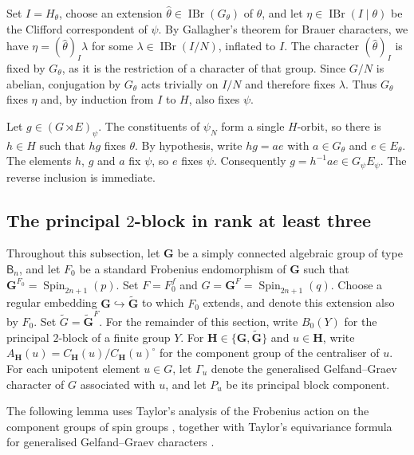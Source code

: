 \documentclass[10pt]{amsart}
\theoremstyle{definition}
\let\oldendproof\endproof
\renewenvironment{proof}[1][\proofname]{%
  \oldproof[\bfseries #1]%
}{\oldendproof}
\DeclareMathOperator{\IBr}{IBr}
\numberwithin{equation}{section}
\numberwithin{table}{section}
\begin{document}
\begin{proof}
Set $I=H_\theta$, choose an extension
$\widehat\theta\in\IBr(G_\theta)$ of $\theta$, and let
$\eta\in\IBr(I\mid\theta)$ be the Clifford correspondent of $\psi$.
By Gallagher's theorem for Brauer characters, we have
$\eta=(\widehat\theta)_I\lambda$ for some
$\lambda\in\IBr(I/N)$, inflated to $I$.
The character $(\widehat\theta)_I$ is fixed by
$G_\theta$, as it is the restriction of a character of that
group.  Since $G/N$ is abelian, conjugation by
$G_\theta$ acts trivially on $I/N$ and therefore fixes
$\lambda$.  Thus $G_\theta$ fixes $\eta$ and, by induction
from $I$ to $H$, also fixes $\psi$.

Let $g\in(G\rtimes E)_\psi$.  The constituents of
$\psi_N$ form a single $H$-orbit, so there is $h\in H$ such that
$hg$ fixes $\theta$.  By hypothesis, write $hg=ae$ with
$a\in G_\theta$ and $e\in E_\theta$.
The elements $h$, $g$ and $a$ fix $\psi$, so $e$ fixes $\psi$.
Consequently $g=h^{-1}ae\in G_\psi E_\psi$.
The reverse inclusion is immediate.
\end{proof}

\subsection{The principal \texorpdfstring{$2$}{2}-block in rank at least three}
\label{subsec:type-b-two-principal}

Throughout this subsection, let $\mathbf G$ be a simply connected algebraic
group of type $\mathsf B_n$,
and let $F_0$ be a standard Frobenius endomorphism of $\mathbf G$
such that $\mathbf G^{F_0}=\operatorname{Spin}_{2n+1}(p)$.
Set $F=F_0^f$ and
$G=\mathbf G^F=\operatorname{Spin}_{2n+1}(q)$.  Choose a regular embedding
$\mathbf G\hookrightarrow\widetilde{\mathbf G}$ to which $F_0$ extends,
and denote this extension also by $F_0$.  Set
$\widetilde G=\widetilde{\mathbf G}^F$.
For the remainder of this section, write $B_0(Y)$ for the principal
$2$-block of a finite group $Y$. For
$\mathbf H\in\{\mathbf G,\widetilde{\mathbf G}\}$ and $u\in\mathbf H$,
write $A_{\mathbf H}(u)=C_{\mathbf H}(u)/C_{\mathbf H}(u)^\circ$ for the
component group of the centraliser of $u$.
For each unipotent element $u\in G$, let $\Gamma_u$ denote the generalised
Gelfand--Graev character of $G$ associated with $u$, and let $P_u$ be its
principal block component.

The following lemma uses Taylor's analysis of the Frobenius action
on the component groups of spin groups \cite[Section~2]{Taylor2013},
together with Taylor's equivariance formula for generalised Gelfand--Graev
characters \cite[Proposition~11.10]{Taylor2018Automorphisms}.
\end{document}
